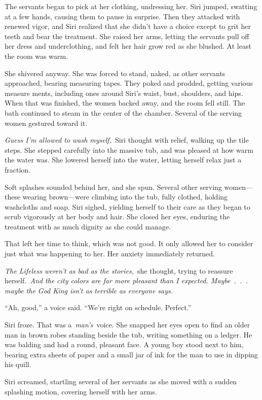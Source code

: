 The servants began to pick at her clothing, undressing her. Siri jumped, swatting at a few hands, causing them to pause in surprise. Then they attacked with renewed vigor, and Siri realized that she didn’t have a choice except to grit her teeth and bear the treatment. She raised her arms, letting the servants pull off her dress and underclothing, and felt her hair grow red as she blushed. At least the room was warm.

She shivered anyway. She was forced to stand, naked, as other servants approached, bearing measuring tapes. They poked and prodded, getting various measure ments, including ones around Siri’s waist, bust, shoulders, and hips. When that was finished, the women backed away, and the room fell still. The bath continued to steam in the center of the chamber. Several of the serving women gestured toward it.

\textit{Guess I’m allowed to wash myself,}~Siri thought with relief, walking up the tile steps. She stepped carefully into the massive tub, and was pleased at how warm the water was. She lowered herself into the water, letting herself relax just a fraction.

Soft splashes sounded behind her, and she spun. Several other serving women—these wearing brown—were climbing into the tub, fully clothed, holding washcloths and soap. Siri sighed, yielding herself to their care as they began to scrub vigorously at her body and hair. She closed her eyes, enduring the treatment with as much dignity as she could manage.

That left her time to think, which was not good. It only allowed her to consider just what was happening to her. Her anxiety immediately returned.

\textit{The Lifeless weren’t as bad as the stories,}~she thought, trying to reassure herself.~\textit{And the city colors are far more pleasant than I expected. Maybe~.~.~. maybe the God King isn’t as terrible as everyone says.}

“Ah, good,” a voice said. “We’re right on schedule. Perfect.”

Siri froze. That was a~\textit{man’s}~voice. She snapped her eyes open to find an older man in brown robes standing beside the tub, writing something on a ledger. He was balding and had a round, pleasant face. A young boy stood next to him, bearing extra sheets of paper and a small jar of ink for the man to use in dipping his quill.

Siri screamed, startling several of her servants as she moved with a sudden splashing motion, covering herself with her arms.

